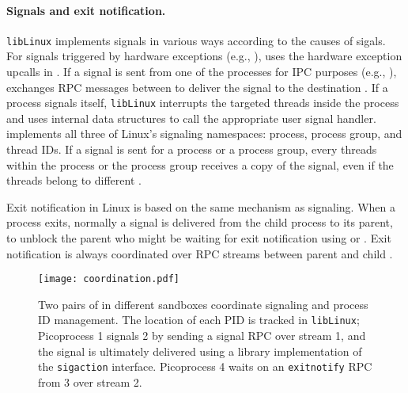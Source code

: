 \paragraph{Signals and exit notification.}
{\tt libLinux} implements signals
in various ways according to the causes of sigals.
For signals triggered by hardware exceptions (e.g., ),
\thelibos{} uses the hardware exception upcalls
in \thehostabi{}.
If a signal is sent from one of the processes for IPC purposes (e.g., ),
\thelibos{} exchanges RPC messages between \picoprocs{} to deliver the signal to the destination \picoproc{}.
If a process signals itself, {\tt libLinux} interrupts the targeted threads inside the process
and uses internal data structures
to call the appropriate user signal handler.
\thelibos{} implements all three of Linux's signaling namespaces:
process, process group, and thread IDs.
If a signal is sent for a process or a process group,
every threads within the process or the process group receives a copy of the signal,
even if the threads belong to different \picoprocs{}.


Exit notification in Linux is based on the same mechanism as signaling.
When a process exits, normally a  signal
is delivered from the child process to its parent,
to unblock the parent who might be waiting for exit notification using  or .
Exit notification is always coordinated over RPC streams
between parent and child \picoprocs{}.



\begin{figure}
\centering
\texttt{[image: coordination.pdf]}
\caption{Two pairs of \graphene{} \picoprocs{} in different sandboxes 
coordinate signaling and process ID management.
The location of each PID is tracked in {\tt libLinux}; Picoprocess 1 signals
\picoproc{} 2 by sending a signal RPC over stream 1,
and the signal is ultimately delivered using a 
library implementation of the {\tt sigaction} interface. Picoprocess 4 
waits on an {\tt exitnotify} RPC from  \picoproc{} 3 over stream 2. }
\label{fig:libos:coordination}
\end{figure}


